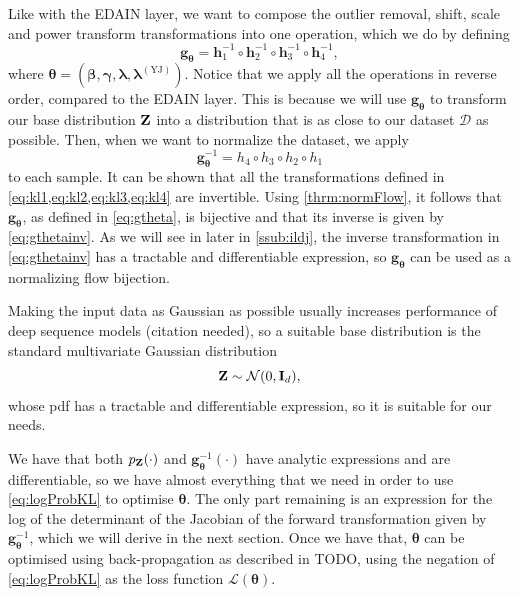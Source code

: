 \documentclass{statsmsc}
\begin{document}
Like with the \ac{EDAIN} layer, we want to compose the outlier removal, shift, scale and power
transform transformations into one operation, which we do by defining
\begin{equation}\label{eq:gtheta}
    \mathbf{g}_{\bm\theta}=\mathbf{h}_1^{-1} \circ  \mathbf{h}_2^{-1} \circ \mathbf{h}_3^{-1} \circ \mathbf{h}_4^{-1},
\end{equation}
where $\bm\theta=(\bm\beta, \bm\gamma, \bm\lambda, \bm\lambda^{(\textrm{YJ})})$.
Notice that we apply all the operations in reverse order, compared to the \ac{EDAIN} layer. This
is because we will use $\mathbf{g}_{\bm\theta}$ to transform our base distribution $\mathbf{Z}$ into
a distribution that is as close to our dataset $\mathcal{D}$ as possible. Then, when we want to
normalize the dataset, we apply
\begin{equation}\label{eq:gthetainv}
    \mathbf{g}_{\bm\theta}^{-1}=h_4 \circ h_3 \circ h_2 \circ h_1
\end{equation}
to each sample.  It can be shown that all the transformations defined in
\cref{eq:kl1,eq:kl2,eq:kl3,eq:kl4} are invertible. Using \cref{thrm:normFlow}, it follows that
$\mathbf{g}_{\bm\theta}$, as defined in \cref{eq:gtheta}, is bijective and that its inverse
is given by \cref{eq:gthetainv}. As we will see in later in \cref{ssub:ildj},
the inverse transformation in \cref{eq:gthetainv} has a tractable and differentiable expression,
so $\mathbf{g}_{\bm\theta}$ can be used as a normalizing flow bijection.

Making the input data as Gaussian as possible usually increases performance of deep sequence models
(citation needed), so a suitable base distribution is the standard multivariate Gaussian distribution
\begin{equation}
    \mathbf{Z} \sim \mathcal{N}(0, \mathbf{I}_d),
\end{equation}
whose \ac{pdf} has a tractable and differentiable expression, so it is suitable for our needs.

We have that both $p_{\mathbf{Z}}(\cdot)$ and $\mathbf{g}_{\bm\theta}^{-1}(\cdot)$ have analytic expressions
and are differentiable, so we have almost everything that we need in order to use
\cref{eq:logProbKL} to optimise $\bm\theta$. The only part remaining is an expression for
the log of the determinant of the Jacobian of the forward transformation given by
$\mathbf{g}_{\bm\theta}^{-1}$, which we will derive in the next section. Once we have that,
$\bm\theta$ can be optimised using back-propagation as described in TODO, using the negation
of \cref{eq:logProbKL} as the loss function $\mathcal{L}(\bm\theta)$.
\end{document}
